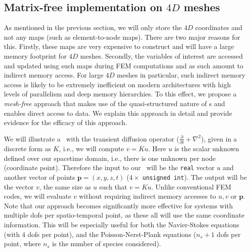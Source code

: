 \subsection{Matrix-free implementation on $4D$ meshes}
\label{s:mvec}

As mentioned in the previous section, we will only store the $4D$ coordinates and not any maps (such as element-to-node maps). There are two major reasons for this. Firstly, these maps are very expensive to construct and will have a large memory footprint for $4D$ meshes. Secondly, the variables of interest are accessed and updated using such maps during FEM computations and as such amount to indirect memory access. For large $4D$ meshes in particular, such indirect memory access is likely to be extremely inefficient on modern architectures with high levels of parallelism and deep memory hierarchies. To this effect, we propose a {\em mesh-free} approach that makes use of the quasi-structured nature of \stri s and enables direct access to data. We explain this approach in detail and provide evidence for the efficacy of this approach.  

We will illustrate a \mvec\ with the transient diffusion operator ($\frac{\partial}{\partial t} + \nabla^2$), given in a discrete form as $K$, i.e., we will compute $v=K u$. Here $u$ is the scalar unknown defined over our spacetime domain, i.e., there is one unknown per node (coordinate point). Therefore the input to our \mvec\ will be the \texttt{real} vector $u$ and another vector of points $\mathbf{p}=(x,y,z,t)$ ($4\times$ \texttt{unsigned int}). The output will be the vector $v$, the same size as $u$ such that $v=K u$. Unlike conventional FEM codes, we will evaluate $v$ without requiring indirect memory accesses to $u,v$ or $\mathbf{p}$. Note that our approach becomes significantly more effective for systems with multiple dofs per spatio-temporal point, as these all will use the same coordinate information. This will be especially useful for both the Navier-Stokes equations (with 4 dofs per point), and the Poisson-Nerst-Plank equations ($n_s+1$ dofs per point, where $n_s$ is the number of species considered).

